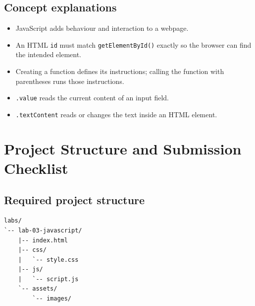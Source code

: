 \documentclass[11pt,a4paper]{article}
\begin{document}
\subsection*{Concept explanations}
\begin{itemize}
    \item JavaScript adds behaviour and interaction to a webpage.
    \item An HTML \texttt{id} must match \texttt{getElementById()} exactly so the browser can find the intended element.
    \item Creating a function defines its instructions; calling the function with parentheses runs those instructions.
    \item \texttt{.value} reads the current content of an input field.
    \item \texttt{.textContent} reads or changes the text inside an HTML element.
\end{itemize}

\section{Project Structure and Submission Checklist}

\subsection*{Required project structure}
\begin{lstlisting}[style=labcode,language={}]
labs/
`-- lab-03-javascript/
    |-- index.html
    |-- css/
    |   `-- style.css
    |-- js/
    |   `-- script.js
    `-- assets/
        `-- images/
\end{lstlisting}
\end{document}
